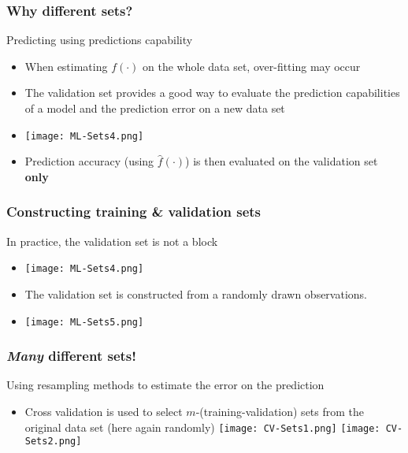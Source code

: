 \documentclass[xcolor=x11names,compress, aspectratio=169]{beamer}
\renewcommand{\(}{\begin{columns}}
\renewcommand{\)}{\end{columns}}
\newcommand{\<}[1]{\begin{column}{#1}}
\renewcommand{\>}{\end{column}}
\begin{document}
\begin{frame}
\frametitle{\textcolor{brique}{Why different sets? }}
Predicting  using predictions capability
\begin{itemize}[<+->]
\item When estimating $f(\cdot)$ on the whole data set, over-fitting may occur
\item The validation set provides a good way to evaluate the prediction capabilities of a model and the prediction error on a new data set
\item[] \texttt{[image: ML-Sets4.png]}
\item Prediction accuracy (using $\widehat f(\cdot)$) is then evaluated on the validation set \textbf{only}
\end{itemize}
\end{frame}


\begin{frame}
\frametitle{\textcolor{brique}{Constructing training \& validation sets}}
In practice, the validation set is not a block
\begin{itemize}[<+->]
\item[] \texttt{[image: ML-Sets4.png]}
\item The validation set is constructed from a randomly drawn observations.
\item[] \texttt{[image: ML-Sets5.png]}
\end{itemize}
\end{frame}


\begin{frame}
\frametitle{\textcolor{brique}{\textit{Many} different sets!  }}
Using resampling methods to  estimate the error on the prediction
\begin{itemize}[<+->]
\item Cross validation is used to select $m$-(training-validation) sets from the original data set (here again randomly)
 {\texttt{[image: CV-Sets1.png]}}
 {\texttt{[image: CV-Sets2.png]}}
\end{itemize}
\end{frame}
\end{document}
